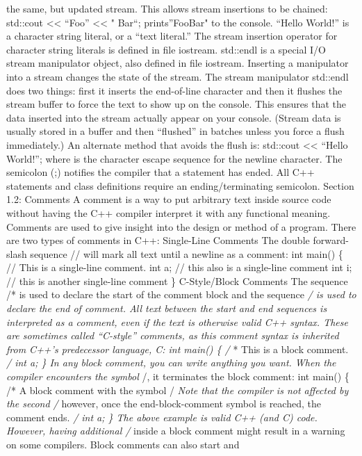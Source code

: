 the same, but updated stream. This allows stream insertions to be
chained: std::cout \textless\textless{} ``Foo'' \textless\textless{} "
Bar``; prints''FooBar" to the console. ``Hello World!'' is a character
string literal, or a ``text literal.'' The stream insertion operator for
character string literals is deﬁned in ﬁle iostream. std::endl is a
special I/O stream manipulator object, also deﬁned in ﬁle iostream.
Inserting a manipulator into a stream changes the state of the stream.
The stream manipulator std::endl does two things: ﬁrst it inserts the
end-of-line character and then it ﬂushes the stream buﬀer to force the
text to show up on the console. This ensures that the data inserted into
the stream actually appear on your console. (Stream data is usually
stored in a buﬀer and then ``ﬂushed'' in batches unless you force a ﬂush
immediately.) An alternate method that avoids the ﬂush is: std::cout
\textless\textless{} ``Hello World!\n''; where \n is the character
escape sequence for the newline character. The semicolon (;) notiﬁes the
compiler that a statement has ended. All C++ statements and class
deﬁnitions require an ending/terminating semicolon. Section 1.2:
Comments A comment is a way to put arbitrary text inside source code
without having the C++ compiler interpret it with any functional
meaning. Comments are used to give insight into the design or method of
a program. There are two types of comments in C++: Single-Line Comments
The double forward-slash sequence // will mark all text until a newline
as a comment: int main() \{  // This is a single-line comment. int a;
// this also is a single-line comment int i; // this is another
single-line comment \} C-Style/Block Comments The sequence /* is used to
declare the start of the comment block and the sequence \emph{/ is used
to declare the end of comment. All text between the start and end
sequences is interpreted as a comment, even if the text is otherwise
valid C++ syntax. These are sometimes called ``C-style'' comments, as
this comment syntax is inherited from C++'s predecessor language, C: int
main() \{ /} * This is a block comment. \emph{/ int a; \} In any block
comment, you can write anything you want. When the compiler encounters
the symbol }/, it terminates the block comment: int main() \{ /* A block
comment with the symbol /\emph{ Note that the compiler is not affected
by the second /} however, once the end-block-comment symbol is reached,
the comment ends. \emph{/ int a; \} The above example is valid C++ (and
C) code. However, having additional /} inside a block comment might
result in a warning on some compilers. Block comments can also start and
